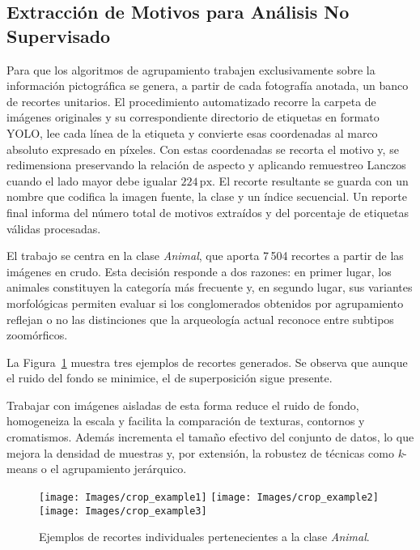 \subsection{Extracción de Motivos para Análisis No Supervisado}

Para que los algoritmos de agrupamiento trabajen exclusivamente sobre la información pictográfica se genera, a partir de cada fotografía anotada, un banco de recortes unitarios.
El procedimiento automatizado recorre la carpeta de imágenes originales y su correspondiente directorio de etiquetas en formato YOLO, lee cada línea de la etiqueta y convierte esas coordenadas al marco absoluto expresado en píxeles.
Con estas coordenadas se recorta el motivo y, se redimensiona preservando la relación de aspecto y aplicando remuestreo Lanczos cuando el lado mayor debe igualar \(224\,\text{px}\).
El recorte resultante se guarda con un nombre que codifica la imagen fuente, la clase y un índice secuencial.
Un reporte final informa del número total de motivos extraídos y del porcentaje de etiquetas válidas procesadas.

El trabajo se centra en la clase \textit{Animal}, que aporta 7\,504 recortes a partir de las imágenes en crudo.
Esta decisión responde a dos razones: en primer lugar, los animales constituyen la categoría más frecuente y, en segundo lugar, sus variantes morfológicas permiten evaluar si los conglomerados obtenidos por agrupamiento reflejan o no las distinciones que la arqueología actual reconoce entre subtipos zoomórficos.

La Figura~\ref{fig:crop_example} muestra tres ejemplos de recortes generados.
Se observa que aunque el ruido del fondo se minimice, el de superposición sigue presente.

Trabajar con imágenes aisladas de esta forma reduce el ruido de fondo, homogeneiza la escala y facilita la comparación de texturas, contornos y cromatismos.
Además incrementa el tamaño efectivo del conjunto de datos, lo que mejora la densidad de muestras y, por extensión, la robustez de técnicas como \emph{k}-means o el agrupamiento jerárquico.

\begin{figure}[ht!]
    \centering
    \texttt{[image: Images/crop\_example1]}\hfill
    \texttt{[image: Images/crop\_example2]}\hfill
    \texttt{[image: Images/crop\_example3]}
    \caption{Ejemplos de recortes individuales pertenecientes a la clase \textit{Animal}.}
    \label{fig:crop_example}
\end{figure}

